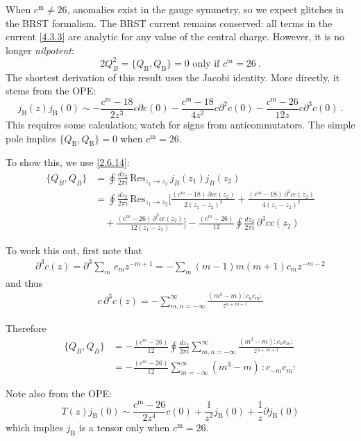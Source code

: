 	When $c^{\mathrm{m}} \neq 26$, anomalies exist in the gauge symmetry, so we expect glitches in the BRST formalism. The BRST current remains conserved: all terms in the current \eqref{4.3.3} are analytic for any value of the central charge. However, it is no longer \emph{nilpotent}:
	\begin{equation}
2Q_B^2=\{Q_{\mathrm{B}}, Q_{\mathrm{B}}\}=0 \text { only if } c^{\mathrm{m}}=26 \:. \label{4.3.9}
\end{equation}
The shortest derivation of this result uses the Jacobi identity. More directly, it stems from the OPE:
\begin{equation}
j_{\mathrm{B}}(z) j_{\mathrm{B}}(0) \sim-\frac{c^{\mathrm{m}}-18}{2 z^{3}} c \partial c(0)-\frac{c^{\mathrm{m}}-18}{4 z^{2}} c \partial^{2} c(0)-\frac{c^{\mathrm{m}}-26}{12 z} c \partial^{3} c(0) \:. \label{4.3.10}
\end{equation}
This requires some calculation; watch for signs from anticommutators. The simple pole implies $\{Q_{\mathrm{B}}, Q_{\mathrm{B}}\}=0$ when $c^{\mathrm{m}}=26$. 

\begin{tcolorbox}[breakable]
	To show this, we use \eqref{2.6.14}:
	\begin{align}
		\{Q_B, Q_B\}
		&= \oint \frac{dz_2}{2\pi i}\,\text{Res}_{z_1 \to z_2} \, j_B(z_1) j_B(z_2) \nonumber\\
		&= \oint \frac{dz_2}{2\pi i}\,\text{Res}_{z_1 \to z_2}
		\Bigg[
		\frac{(c^m - 18)\,\partial c c(z_2)}{2(z_1 - z_2)^3}
		+ \frac{(c^m - 18)\,\partial^2 c c(z_2)}{4(z_1 - z_2)^2}\nonumber\\
		&\quad
		+ \frac{(c^m - 26)\,\partial^3 c c(z_2)}{12(z_1 - z_2)}
		\Bigg]  - \frac{(c^m - 26)}{12} \oint \frac{dz_2}{2\pi i}\,\partial^3 c c(z_2)
	\end{align}
	
	To work this out, first note that
	\begin{align}
		\partial^3 c(z) =\partial^3 \sum_{m}\,c_m z^{-m+1} = - \sum_m (m-1)m(m+1)c_m z^{-m-2}
	\end{align}
	and thus
	\begin{align}
		c\,\partial^3 c(z)
		= - \sum_{m,n=-\infty}^{\infty} \frac{(m^3 - m) :c_n c_m:}{z^{n+m+1}}
	\end{align}
	
	Therefore
	\begin{align}
		\{Q_B, Q_B\}
		&= -\frac{(c^m - 26)}{12}
		\oint \frac{dz_2}{2\pi i}
		\sum_{m,n=-\infty}^{\infty}
		\frac{(m^3 - m) :c_n c_m:}{z^{n+m+1}} \\
		&= -\frac{(c^m - 26)}{12}
		\sum_{m=-\infty}^{\infty}
		(m^3 - m)\, :c_{-m} c_m:
	\end{align}
\end{tcolorbox}
Note also from the OPE:
\begin{equation}
T(z) j_{\mathrm{B}}(0) \sim \frac{c^{\mathrm{m}}-26}{2 z^{4}} c(0)+\frac{1}{z^{2}} j_{\mathrm{B}}(0)+\frac{1}{z} \partial j_{\mathrm{B}}(0)
\end{equation}
which implies $j_{\mathrm{B}}$ is a tensor only when $c^{\mathrm{m}}=26$.

